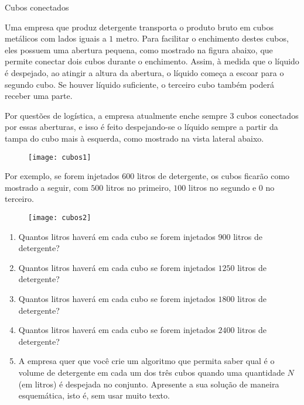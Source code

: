 \begin{task}{Cubos conectados}
\label{comp-task6}

Uma empresa que produz detergente transporta o produto bruto em cubos metálicos com lados iguais a $1$ metro. Para facilitar o enchimento destes cubos, eles possuem uma abertura pequena, como mostrado na figura abaixo, que permite conectar dois cubos durante o enchimento. Assim, à medida que o líquido é despejado, ao atingir a altura da abertura, o líquido começa a escoar para o segundo cubo. Se houver líquido suficiente, o terceiro cubo também poderá receber uma parte.

Por questões de logística, a empresa atualmente enche sempre $3$ cubos conectados por essas aberturas, e isso é feito despejando-se o líquido sempre a partir da tampa do cubo mais à esquerda, como mostrado na vista lateral abaixo.

\begin{figure}[H]
\centering

\texttt{[image: cubos1]}
\end{figure}

Por exemplo, se forem injetados $600$ litros de detergente, os cubos ficarão como mostrado a seguir, com $500$ litros no primeiro, $100$ litros no segundo e $0$ no terceiro.

\begin{figure}[H]
\centering

\texttt{[image: cubos2]}
\end{figure}

\begin{enumerate}
\item Quantos litros haverá em cada cubo se forem injetados $900$ litros de detergente?

\item Quantos litros haverá em cada cubo se forem injetados $1250$ litros de detergente?

\item Quantos litros haverá em cada cubo se forem injetados $1800$ litros de detergente?

\item Quantos litros haverá em cada cubo se forem injetados $2400$ litros de detergente?

\item A empresa quer que você crie um algoritmo que permita saber qual é o volume de detergente em cada um dos três cubos quando uma quantidade $N$ (em litros) é despejada no conjunto. Apresente a sua solução de maneira esquemática, isto é, sem usar muito texto.
\end{enumerate}


\end{task}

